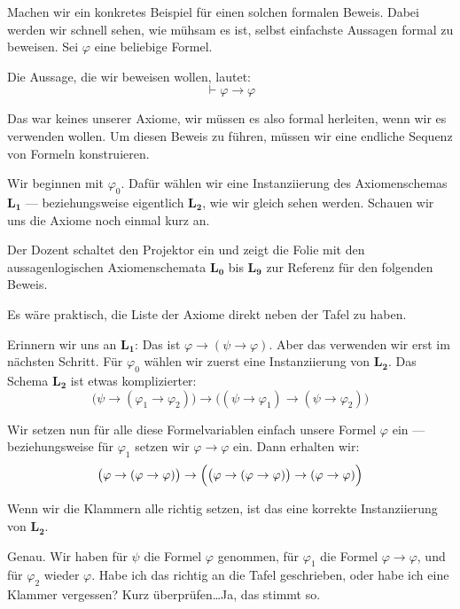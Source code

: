 \begin{spoken-clean}[00:30:35 - 00:33:46]
Machen wir ein konkretes Beispiel für einen solchen formalen Beweis. Dabei werden wir schnell sehen, wie mühsam es ist, selbst einfachste Aussagen formal zu beweisen. Sei $\varphi$ eine beliebige Formel. 

Die Aussage, die wir beweisen wollen, lautet:
\[ \vdash \varphi \rightarrow \varphi \]

Das war keines unserer Axiome, wir müssen es also formal herleiten, wenn wir es verwenden wollen. Um diesen Beweis zu führen, müssen wir eine endliche Sequenz von Formeln konstruieren. 

Wir beginnen mit $\varphi_0$. Dafür wählen wir eine Instanziierung des Axiomenschemas $\mathbf{L_1}$ --- beziehungsweise eigentlich $\mathbf{L_2}$, wie wir gleich sehen werden. Schauen wir uns die Axiome noch einmal kurz an.
\end{spoken-clean}

\begin{meta-note}
Der Dozent schaltet den Projektor ein und zeigt die Folie mit den aussagenlogischen Axiomenschemata $\mathbf{L_0}$ bis $\mathbf{L_9}$ zur Referenz für den folgenden Beweis.
\end{meta-note}

\begin{spoken-clean}[00:33:46 - 00:36:09]
Es wäre praktisch, die Liste der Axiome direkt neben der Tafel zu haben. 

Erinnern wir uns an $\mathbf{L_1}$: Das ist $\varphi \rightarrow (\psi \rightarrow \varphi)$. Aber das verwenden wir erst im nächsten Schritt. Für $\varphi_0$ wählen wir zuerst eine Instanziierung von $\mathbf{L_2}$. Das Schema $\mathbf{L_2}$ ist etwas komplizierter:
\[ \bigl(\psi \rightarrow (\varphi_1 \rightarrow \varphi_2)\bigr) \rightarrow \bigl((\psi \rightarrow \varphi_1) \rightarrow (\psi \rightarrow \varphi_2)\bigr) \]

Wir setzen nun für alle diese Formelvariablen einfach unsere Formel $\varphi$ ein --- beziehungsweise für $\varphi_1$ setzen wir $\varphi \rightarrow \varphi$ ein. Dann erhalten wir:
\[ \bigl(\varphi \rightarrow (\varphi \rightarrow \varphi)\bigr) \rightarrow \Bigl(\bigl(\varphi \rightarrow (\varphi \rightarrow \varphi)\bigr) \rightarrow (\varphi \rightarrow \varphi)\Bigr) \]

Wenn wir die Klammern alle richtig setzen, ist das eine korrekte Instanziierung von $\mathbf{L_2}$. 

Genau. Wir haben für $\psi$ die Formel $\varphi$ genommen, für $\varphi_1$ die Formel $\varphi \rightarrow \varphi$, und für $\varphi_2$ wieder $\varphi$. Habe ich das richtig an die Tafel geschrieben, oder habe ich eine Klammer vergessen? Kurz überprüfen\dots Ja, das stimmt so.
\end{spoken-clean}

